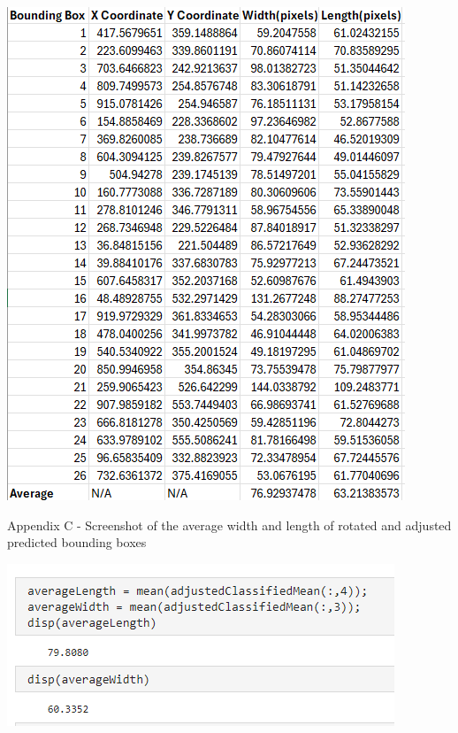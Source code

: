 \documentclass[man]{apa7}
\begin{document}
\begin{minipage}{\linewidth}
  \includegraphics[]{figures/adjustedBoxes.png}
  \label{fig:adjustedMeans}
\end{minipage}

\newpage

\noindent Appendix C - Screenshot of the average width and length of rotated and adjusted predicted bounding boxes

\begin{minipage}{\linewidth}
  \includegraphics[]{figures/ssAverage.png}
  \label{fig:averageLW}
\end{minipage}
\end{document}

